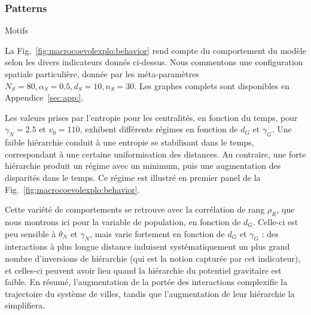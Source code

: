 \subsubsection{Patterns}{Motifs}



La Fig.~\ref{fig:macrocoevolexplo:behavior} rend compte du comportement du modèle selon les divers indicateurs donnés ci-dessus. Nous commentons une configuration spatiale particulière, donnée par les méta-paramètres $N_S=80,\alpha_S=0.5,d_S=10,n_S=30$. Les graphes complets sont disponibles en Appendice~\ref{sec:app:}.


Les valeurs prises par l'entropie pour les centralités, en fonction du temps, pour $\gamma_N = 2.5$ et $v_0 = 110$, exhibent différents régimes en fonction de $d_G$ et $\gamma_G$. Une faible hiérarchie conduit à une entropie se stabilisant dans le temps, correspondant à une certaine uniformisation des distances. Au contraire, une forte hiérarchie produit un régime avec un minimum, puis une augmentation des disparités dans le temps. Ce régime est illustré en premier panel de la Fig.~\ref{fig:macrocoevolexplo:behavior}.


Cette variété de comportements se retrouve avec la corrélation de rang $\rho_R$, que nous montrons ici pour la variable de population, en fonction de $d_G$. Celle-ci est peu sensible à $\theta_N$ et $\gamma_N$, mais varie fortement en fonction de $d_G$ et $\gamma_G$ : des interactions à plus longue distance induisent systématiquement un plus grand nombre d'inversions de hiérarchie (qui est la notion capturée par cet indicateur), et celles-ci peuvent avoir lieu quand la hiérarchie du potentiel gravitaire est faible. En résumé, l'augmentation de la portée des interactions complexifie la trajectoire du système de villes, tandis que l'augmentation de leur hiérarchie la simplifiera.





